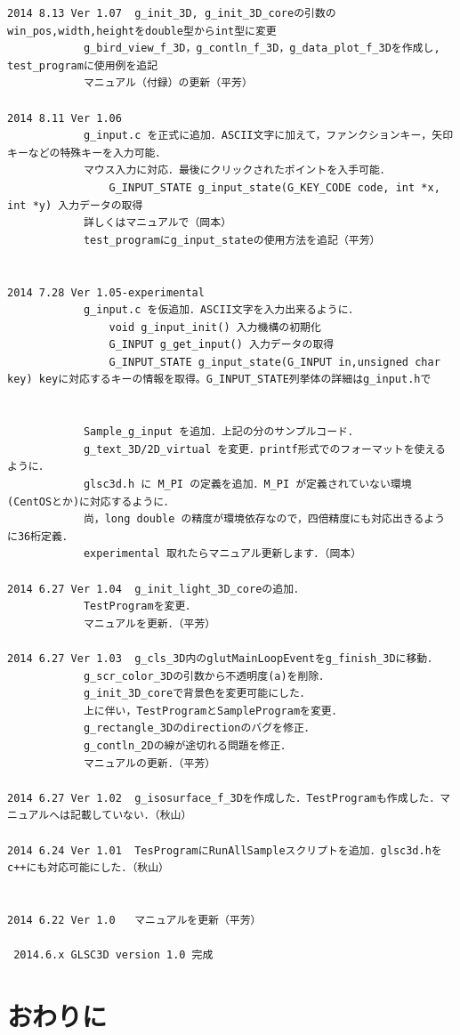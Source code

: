 \documentclass[platex,a4paper,12pt]{jsarticle}%
\begin{document}
\begin{verbatim}
2014 8.13 Ver 1.07	g_init_3D, g_init_3D_coreの引数のwin_pos,width,heightをdouble型からint型に変更
			g_bird_view_f_3D，g_contln_f_3D，g_data_plot_f_3Dを作成し, test_programに使用例を追記
			マニュアル（付録）の更新（平芳）

2014 8.11 Ver 1.06
			g_input.c を正式に追加．ASCII文字に加えて，ファンクションキー，矢印キーなどの特殊キーを入力可能．
			マウス入力に対応．最後にクリックされたポイントを入手可能．
				G_INPUT_STATE g_input_state(G_KEY_CODE code, int *x, int *y) 入力データの取得
			詳しくはマニュアルで（岡本）
			test_programにg_input_stateの使用方法を追記（平芳）


2014 7.28 Ver 1.05-experimental
			g_input.c を仮追加．ASCII文字を入力出来るように．
				void g_input_init() 入力機構の初期化
				G_INPUT g_get_input() 入力データの取得
				G_INPUT_STATE g_input_state(G_INPUT in,unsigned char key) keyに対応するキーの情報を取得。G_INPUT_STATE列挙体の詳細はg_input.hで


			Sample_g_input を追加．上記の分のサンプルコード．
			g_text_3D/2D_virtual を変更．printf形式でのフォーマットを使えるように．
			glsc3d.h に M_PI の定義を追加．M_PI が定義されていない環境(CentOSとか)に対応するように．
			尚，long double の精度が環境依存なので，四倍精度にも対応出きるように36桁定義．
			experimental 取れたらマニュアル更新します．（岡本）

2014 6.27 Ver 1.04	g_init_light_3D_coreの追加．
			TestProgramを変更．
			マニュアルを更新．（平芳）

2014 6.27 Ver 1.03	g_cls_3D内のglutMainLoopEventをg_finish_3Dに移動．
			g_scr_color_3Dの引数から不透明度(a)を削除．
			g_init_3D_coreで背景色を変更可能にした．
			上に伴い，TestProgramとSampleProgramを変更．
			g_rectangle_3Dのdirectionのバグを修正．
			g_contln_2Dの線が途切れる問題を修正．
			マニュアルの更新．（平芳）

2014 6.27 Ver 1.02 	g_isosurface_f_3Dを作成した．TestProgramも作成した．マニュアルへは記載していない．（秋山）

2014 6.24 Ver 1.01 	TesProgramにRunAllSampleスクリプトを追加．glsc3d.hをc++にも対応可能にした．（秋山）


2014 6.22 Ver 1.0 	マニュアルを更新（平芳）

 2014.6.x GLSC3D version 1.0 完成
\end{verbatim}
\newpage
\section{おわりに}
\end{document}
